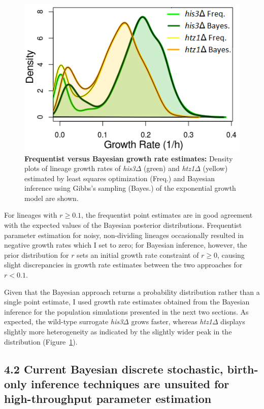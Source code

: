 \documentclass{bioinfo}
\begin{document}
{\setcounter{figure}{15}
\vspace{-2em}
\begin{figure}[H]
\centering
\includegraphics[width=0.75\linewidth]{Ch2LawlessDens.png}
\vspace{-1em}
\caption{\footnotesize{\textbf{Frequentist versus Bayesian growth rate estimates:} Density plots of lineage growth rates of \textit{his3}$\Delta$ (green) and \textit{htz1}$\Delta$ (yellow) estimated by least squares optimization (Freq.) and Bayesian inference using Gibbs's sampling (Bayes.) of the exponential growth model are shown.}}
\label{fig:LawDen}
\end{figure}
\vspace{-4em}

For lineages with $r\geq 0.1$, the frequentist point estimates are in good agreement with the expected values of the Bayesian posterior distributions. Frequentist parameter estimation for noisy, non-dividing lineages occasionally resulted in negative growth rates which I set to zero; for Bayesian inference, however, the prior distribution for $r$ sets an initial growth rate constraint of $r\geq 0$, causing slight discrepancies in growth rate estimates between the two approaches for $r<0.1$. 

Given that the Bayesian approach returns a probability distribution rather than a single point estimate, I used growth rate estimates obtained from the Bayesian inference for the population simulations presented in the next two sections. As expected, the wild-type surrogate \textit{his3}$\Delta$ grows faster, whereas \textit{htz1}$\Delta$ displays slightly more heterogeneity as indicated by the slightly wider peak in the distribution (Figure~\ref{fig:LawDen}). 

\vspace{+1em}
\subsection*{4.2 Current Bayesian discrete stochastic, birth-only inference techniques are unsuited for high-throughput parameter estimation}

}
\end{document}
